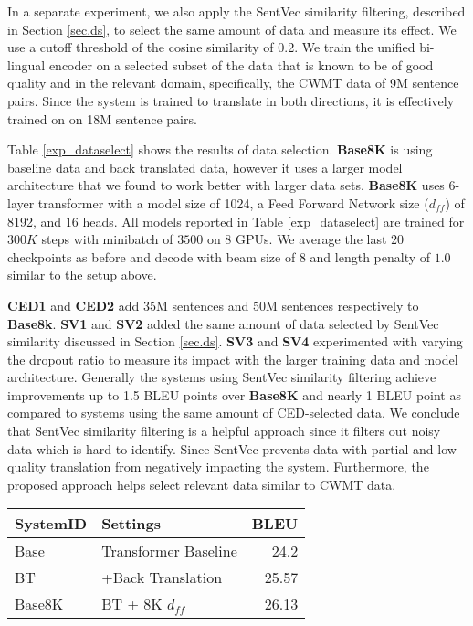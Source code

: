 \documentclass[a4paper]{article}
\begin{document}
\begin{CJK*}{UTF8}{gbsn}
In a separate experiment, we also apply the SentVec similarity filtering, described in Section \ref{sec.ds},  to select the same amount of data and measure its effect. We use  a cutoff threshold of the cosine similarity of 0.2. We train the unified bi-lingual encoder on a selected subset of the data that is known to be of good quality and in the relevant domain, specifically, the CWMT data of 9M sentence pairs. Since the system is trained to translate in both directions, it is effectively trained on on 18M sentence pairs.

Table \ref{exp_dataselect} shows the results of data selection. \textbf{Base8K} is using baseline data and back translated data, however it uses a larger model architecture that we found to work better with larger data sets. \textbf{Base8K} uses  6-layer transformer with a model size of 1024, a Feed Forward Network size ($d_{ff}$) of 8192, and 16 heads. All models reported in Table \ref{exp_dataselect}  are trained for  $300K$ steps with minibatch of $3500$ on 8 GPUs. We average the last $20$ checkpoints as before and decode with beam size of $8$ and length penalty of $1.0$ similar to the setup above.

\textbf{CED1} and \textbf{CED2} add 35M sentences and 50M sentences respectively to \textbf{Base8k}. \textbf{SV1}
and \textbf{SV2} added the same amount of data selected by SentVec similarity discussed in Section \ref{sec.ds}.  \textbf{SV3} and  \textbf{SV4} experimented with varying the dropout ratio to measure its impact with the larger training data and model architecture. Generally the systems using  SentVec similarity filtering  achieve improvements up to 1.5  BLEU points over \textbf{Base8K} and nearly 1 BLEU point as compared to systems using the same amount of CED-selected data. We conclude that SentVec similarity filtering is a helpful approach since it filters out noisy data which is hard to identify. Since SentVec prevents data with partial and low-quality translation from negatively impacting the system. Furthermore, the proposed approach helps select relevant data similar to CWMT data.

\begin{table}[ht]
\centering
\begin{tabular}{@{}llr@{}}
\textbf{SystemID} &\textbf{Settings}                                       & \textbf{BLEU} \\
\toprule
Base & Transformer Baseline    & 24.2       \\ 
BT & +Back Translation     & 25.57                \\
Base8K & BT + 8K $d_{ff}$ & 26.13 \\
 

\end{tabular}
\end{table}
\end{CJK*}
\end{document}
